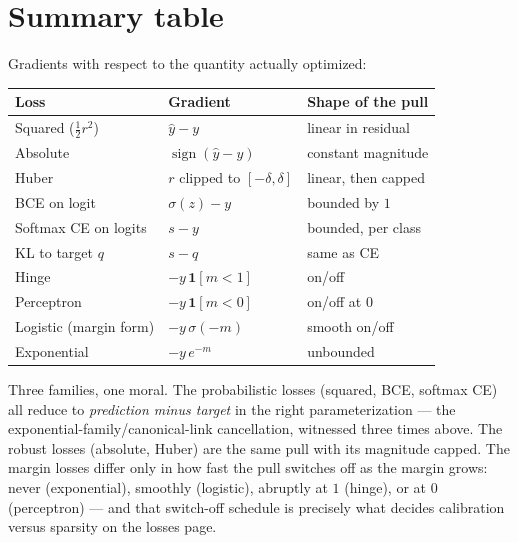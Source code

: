 \documentclass[11pt]{article}
\begin{document}
\section{Summary table}

Gradients with respect to the quantity actually optimized:

\begin{center}
\begin{tabular}{lll}
\toprule
Loss & Gradient & Shape of the pull\\
\midrule
Squared ($\tfrac12 r^2$) & $\hat y - y$ & linear in residual\\
Absolute & $\operatorname{sign}(\hat y - y)$ & constant magnitude\\
Huber & $r$ clipped to $[-\delta, \delta]$ & linear, then capped\\
BCE on logit & $\sigma(z) - y$ & bounded by $1$\\
Softmax CE on logits & $s - y$ & bounded, per class\\
KL to target $q$ & $s - q$ & same as CE\\
Hinge & $-y\,\mathbf{1}[m < 1]$ & on/off\\
Perceptron & $-y\,\mathbf{1}[m < 0]$ & on/off at $0$\\
Logistic (margin form) & $-y\,\sigma(-m)$ & smooth on/off\\
Exponential & $-y\,e^{-m}$ & unbounded\\
\bottomrule
\end{tabular}
\end{center}

\medskip
\noindent
Three families, one moral. The probabilistic losses (squared, BCE,
softmax CE) all reduce to \emph{prediction minus target} in the right
parameterization --- the exponential-family/canonical-link
cancellation, witnessed three times above. The robust losses (absolute,
Huber) are the same pull with its magnitude capped. The margin losses
differ only in how fast the pull switches off as the margin grows:
never (exponential), smoothly (logistic), abruptly at $1$ (hinge), or
at $0$ (perceptron) --- and that switch-off schedule is precisely what
decides calibration versus sparsity on the losses page.
\end{document}
